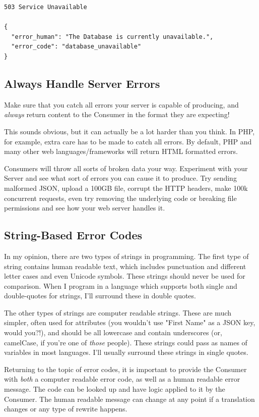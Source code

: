 \documentclass{book}
\begin{document}
\begin{verbatim}
503 Service Unavailable

{
  "error_human": "The Database is currently unavailable.",
  "error_code": "database_unavailable"
}
\end{verbatim}

\subsection{Always Handle Server Errors}

Make sure that you catch all errors your server is capable of producing, and \emph{always} return content to the Consumer in the format they are expecting!

This sounds obvious, but it can actually be a lot harder than you think. In PHP, for example, extra care has to be made to catch all errors. By default, PHP and many other web languages/frameworks will return HTML formatted errors.

Consumers will throw all sorts of broken data your way. Experiment with your Server and see what sort of errors you can cause it to produce. Try sending malformed JSON, upload a 100GB file, corrupt the HTTP headers, make 100k concurrent requests, even try removing the underlying code or breaking file permissions and see how your web server handles it.

\subsection{String-Based Error Codes}

In my opinion, there are two types of strings in programming. The first type of string contains human readable text, which includes punctuation and different letter cases and even Unicode symbols. These strings should never be used for comparison. When I program in a language which supports both single and double-quotes for strings, I'll surround these in double quotes.

The other types of strings are computer readable strings. These are much simpler, often used for attributes (you wouldn't use "First Name" as a JSON key, would you?!), and should be all lowercase and contain underscores (or, camelCase, if you're one of \emph{those} people). These strings could pass as names of variables in most languages. I'll usually surround these strings in single quotes.

Returning to the topic of error codes, it is important to provide the Consumer with \emph{both} a computer readable error code, as well as a human readable error message. The code can be looked up and have logic applied to it by the Consumer. The human readable message can change at any point if a translation changes or any type of rewrite happens.
\end{document}
